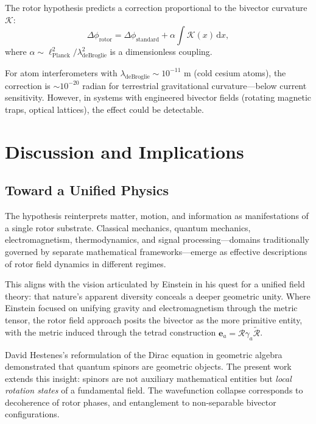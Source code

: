 \documentclass[11pt,a4paper]{article}
\newcommand{\rev}[1]{\widetilde{#1}}           %
\newcommand{\Rotor}{\mathcal{R}}
\theoremstyle{definition}
\theoremstyle{plain}
\theoremstyle{remark}
\begin{document}
The rotor hypothesis predicts a correction proportional to the bivector curvature $\mathcal{K}$:
\begin{equation}
\Delta\phi_{\text{rotor}} = \Delta\phi_{\text{standard}} + \alpha \int \mathcal{K}(x)\, \mathrm{d}x,
\end{equation}
where $\alpha \sim \ell_{\text{Planck}}^2/\lambda_{\text{deBroglie}}^2$ is a dimensionless coupling.

For atom interferometers with $\lambda_{\text{deBroglie}} \sim 10^{-11}$ m (cold cesium atoms), the correction is $\sim 10^{-20}$ radian for terrestrial gravitational curvature---below current sensitivity. However, in systems with engineered bivector fields (rotating magnetic traps, optical lattices), the effect could be detectable.

\vspace{1em}

\section{Discussion and Implications}\label{sec:discussion}

\subsection{Toward a Unified Physics}

The hypothesis reinterprets matter, motion, and information as manifestations of a single rotor substrate. Classical mechanics, quantum mechanics, electromagnetism, thermodynamics, and signal processing---domains traditionally governed by separate mathematical frameworks---emerge as effective descriptions of rotor field dynamics in different regimes.

This aligns with the vision articulated by Einstein in his quest for a unified field theory: that nature's apparent diversity conceals a deeper geometric unity. Where Einstein focused on unifying gravity and electromagnetism through the metric tensor, the rotor field approach posits the bivector as the more primitive entity, with the metric induced through the tetrad construction $\mathbf{e}_a = \Rotor \gamma_a \rev{\Rotor}$.

David Hestenes's reformulation of the Dirac equation in geometric algebra demonstrated that quantum spinors are geometric objects. The present work extends this insight: spinors are not auxiliary mathematical entities but \emph{local rotation states} of a fundamental field. The wavefunction collapse corresponds to decoherence of rotor phases, and entanglement to non-separable bivector configurations.
\end{document}
